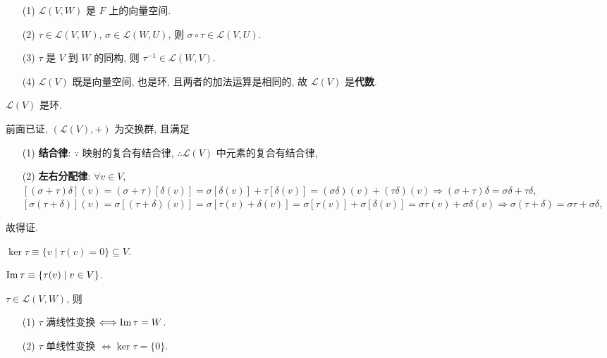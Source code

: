 \documentclass{note}
\begin{document}
\begin{thm}[(课本定理 2.1)]
    \begin{itemize}
        \item[(1)] $\mathcal{L}(V,W)$ 是 $F$ 上的向量空间.
        \item[(2)] $\tau\in\mathcal{L}(V,W)$, $\sigma\in\mathcal{L}(W,U)$, 则 $\sigma\circ\tau\in\mathcal{L}(V,U)$.
        \item[(3)] $\tau$ 是 $V$ 到 $W$ 的同构, 则 $\tau^{-1}\in\mathcal{L}(W,V)$.
        \item[(4)] $\mathcal{L}(V)$ 既是向量空间, 也是环, 且两者的加法运算是相同的, 故 $\mathcal{L}(V)$ 是\textbf{代数}.
    \end{itemize}
\end{thm}

$\mathcal{L}(V)$ 是环.
\begin{pf}
    前面已证, $(\mathcal{L}(V),+)$ 为交换群, 且满足
    \begin{itemize}
        \item[(1)] \textbf{结合律}: $\because$ 映射的复合有结合律, $\therefore\mathcal{L}(V)$ 中元素的复合有结合律,
        \item[(2)] \textbf{左右分配律}: $\forall v\in V$, $[(\sigma+\tau)\delta](v)=(\sigma+\tau)[\delta(v)]=\sigma[\delta(v)]+\tau[\delta(v)]=(\sigma\delta)(v)+(\tau\delta)(v)\Longrightarrow(\sigma+\tau)\delta=\sigma\delta+\tau\delta$,\\
        $[\sigma(\tau+\delta)](v)=\sigma[(\tau+\delta)(v)]=\sigma[\tau(v)+\delta(v)]=\sigma[\tau(v)]+\sigma[\delta(v)]=\sigma\tau(v)+\sigma\delta(v)\Longrightarrow\sigma(\tau+\delta)=\sigma\tau+\sigma\delta$,
    \end{itemize}
    故得证.
\end{pf}

\begin{df}[核空间]
    $\ker\tau\equiv\{v\mid\tau(v)=0\}\subseteq V$.
\end{df}

\begin{df}[像空间]
    $\operatorname{Im}\tau\equiv\{\tau(v)\mid v\in V\}$.
\end{df}

\begin{thm}[(课本定理 2.3)]
    $\tau\in\mathcal{L}(V,W)$, 则
    \begin{itemize}
        \item[(1)] $\tau$ 满线性变换 $\Longleftrightarrow\operatorname{Im}\tau=W$.
        \item[(2)] $\tau$ 单线性变换 $\Longleftrightarrow\ker\tau=\{0\}$.
    \end{itemize}
\end{thm}
\end{document}

